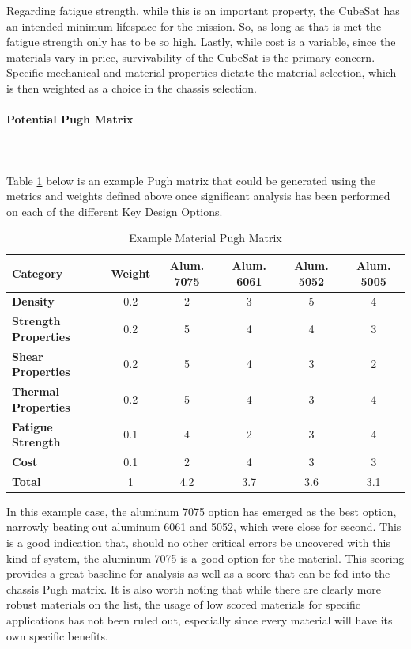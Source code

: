 Regarding fatigue strength, while this is an important property, the CubeSat has an intended minimum lifespace for the mission. So, as long as that is met the fatigue strength only has to be so high. Lastly, while cost is a variable, since the materials vary in price, survivability of the CubeSat is the primary concern. Specific mechanical and material properties dictate the material selection, which is then weighted as a choice in the chassis selection.

\paragraph{Potential Pugh Matrix} ~\\~\\

Table \ref{tbl:material_Pugh} below is an example Pugh matrix that could be generated using the metrics and weights defined above once significant analysis has been performed on each of the different Key Design Options. 
\begin{table}[H]
\centering
\begin{tabular}{|l|c|c|c|c|c|} 
\hline
    \textbf{Category} & \textbf{Weight} & \textbf{Alum. 7075} & \textbf{Alum. 6061} & \textbf{Alum. 5052} & \textbf{Alum. 5005}
    \\
\hline
    \textbf{Density} & 0.2 & 2 & 3 & 5 & 4
    \\
\hline
    \textbf{Strength Properties} & 0.2 & 5 & 4 & 4 & 3 
    \\
\hline
    \textbf{Shear Properties} & 0.2 & 5 & 4 & 3 & 2 
    \\
\hline
    \textbf{Thermal Properties} & 0.2 & 5 & 4 & 3 & 4
    \\
\hline
    \textbf{Fatigue Strength} & 0.1 & 4 & 2 & 3 & 4 
    \\
\hline
    \textbf{Cost} & 0.1 & 2 & 4 & 3 & 3 
    \\
\hline
    \textbf{Total} & 1 & 4.2 & 3.7 & 3.6 & 3.1 
    \\
\hline
\end{tabular}
\caption{Example Material Pugh Matrix }
\label{tbl:material_Pugh}
\end{table}

In this example case, the aluminum 7075 option has emerged as the best option, narrowly beating out aluminum 6061 and 5052, which were close for second. This is a good indication that, should no other critical errors be uncovered with this kind of system, the aluminum 7075 is a good option for the material. This scoring provides a great baseline for analysis as well as a score that can be fed into the chassis Pugh matrix. It is also worth noting that while there are clearly more robust materials on the list, the usage of low scored materials for specific applications has not been ruled out, especially since every material will have its own specific benefits.

